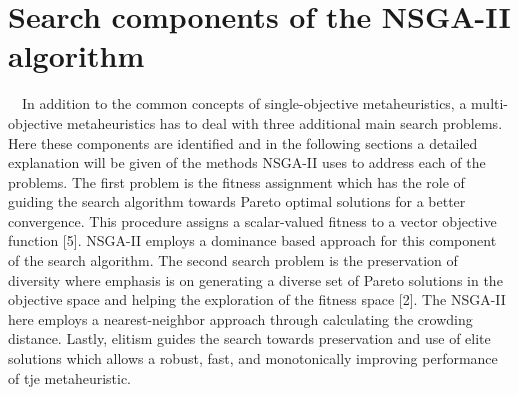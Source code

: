 \section[Search components of the NSGA-II algorithm]{\label{identificadorReferenciaCruzada}
Search components of the NSGA-II algorithm}

\ \ In addition to the common concepts of single-objective metaheuristics, a multi-objective metaheuristics has to deal with three additional main search problems. Here these components are identified and in the following sections a detailed explanation will be given of the methods NSGA-II uses to address each of the problems. The first problem is the fitness assignment which has the role of guiding the search algorithm towards Pareto optimal solutions for a better convergence. This procedure assigns a scalar-valued fitness to a vector objective function [5]. NSGA-II employs a dominance based approach for this component of the search algorithm. The second search problem is the preservation of diversity where emphasis is on generating a diverse set of Pareto solutions in the objective space and helping the exploration of the fitness space [2]. The NSGA-II here employs a nearest-neighbor approach through calculating the crowding distance. Lastly, elitism guides the search towards preservation and use of elite solutions which allows a robust, fast, and monotonically improving performance of tje metaheuristic.